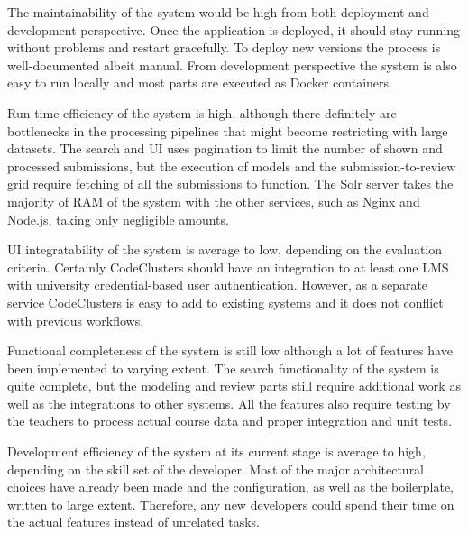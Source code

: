 The maintainability of the system would be high from both deployment and development perspective. Once the application is deployed, it should stay running without problems and restart gracefully. To deploy new versions the process is well-documented albeit manual. From development perspective the system is also easy to run locally and most parts are executed as Docker containers.

Run-time efficiency of the system is high, although there definitely are bottlenecks in the processing pipelines that might become restricting with large datasets. The search and UI uses pagination to limit the number of shown and processed submissions, but the execution of models and the submission-to-review grid require fetching of all the submissions to function. The Solr server takes the majority of RAM of the system with the other services, such as Nginx and Node.js, taking only negligible amounts.

UI integratability of the system is average to low, depending on the evaluation criteria. Certainly CodeClusters should have an integration to at least one LMS with university credential-based user authentication. However, as a separate service CodeClusters is easy to add to existing systems and it does not conflict with previous workflows.

Functional completeness of the system is still low although a lot of features have been implemented to varying extent. The search functionality of the system is quite complete, but the modeling and review parts still require additional work as well as the integrations to other systems. All the features also require testing by the teachers to process actual course data and proper integration and unit tests.

Development efficiency of the system at its current stage is average to high, depending on the skill set of the developer. Most of the major architectural choices have already been made and the configuration, as well as the boilerplate, written to large extent. Therefore, any new developers could spend their time on the actual features instead of unrelated tasks.
